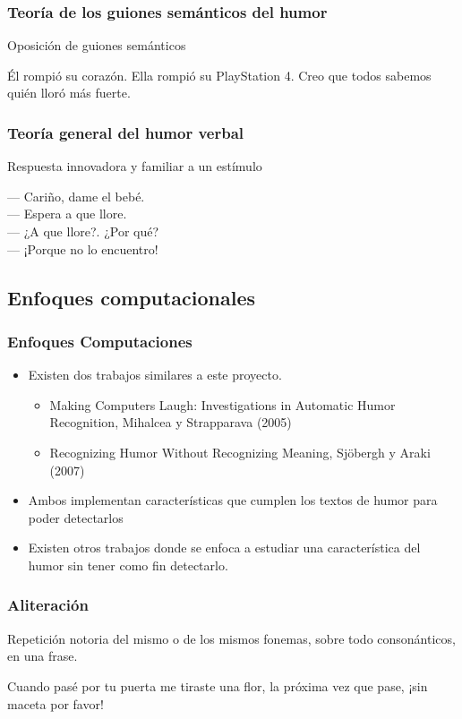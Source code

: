 \begin{frame}
\frametitle{Teoría de los guiones semánticos del humor}
	Oposición de guiones semánticos
	\begin{example}
		Él rompió su corazón. Ella rompió su PlayStation 4. Creo que todos sabemos quién lloró más fuerte.
	\end{example}
\end{frame}

\begin{frame}
\frametitle{Teoría general del humor verbal}
	Respuesta innovadora y familiar a un estímulo
	\begin{example}
		— Cariño, dame el bebé.\\
		— Espera a que llore.\\
		— ¿A que llore?. ¿Por qué?\\
		— ¡Porque no lo encuentro!\\
	\end{example}
\end{frame}

\subsection{Enfoques computacionales}
\begin{frame}
\frametitle{Enfoques Computaciones}
	\begin{itemize}
		\item Existen dos trabajos similares a este proyecto.
		\begin{itemize}
			\item Making Computers Laugh: Investigations in Automatic Humor Recognition, Mihalcea y Strapparava (2005)
			\item Recognizing Humor Without Recognizing Meaning, Sjöbergh y Araki (2007)
		\end{itemize}
		\item Ambos implementan características que cumplen los textos de humor para poder detectarlos
		\item Existen otros trabajos donde se enfoca a estudiar una característica del humor sin tener como fin detectarlo.
	\end{itemize}
\end{frame}

\begin{frame}
\frametitle{Aliteración}
	Repetición notoria del mismo o de los mismos fonemas, sobre todo consonánticos, en una frase.
	\begin{example}
		Cuando pasé por tu puerta me tiraste una flor, la próxima vez que pase, ¡sin maceta por favor!
	\end{example}
\end{frame}

